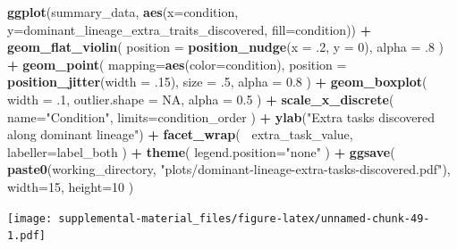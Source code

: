 \documentclass[]{book}
\newenvironment{Shaded}{\begin{snugshade}}{\end{snugshade}}
\newcommand{\DataTypeTok}[1]{\textcolor[rgb]{0.13,0.29,0.53}{#1}}
\newcommand{\DecValTok}[1]{\textcolor[rgb]{0.00,0.00,0.81}{#1}}
\newcommand{\FloatTok}[1]{\textcolor[rgb]{0.00,0.00,0.81}{#1}}
\newcommand{\KeywordTok}[1]{\textcolor[rgb]{0.13,0.29,0.53}{\textbf{#1}}}
\newcommand{\NormalTok}[1]{#1}
\newcommand{\OperatorTok}[1]{\textcolor[rgb]{0.81,0.36,0.00}{\textbf{#1}}}
\newcommand{\OtherTok}[1]{\textcolor[rgb]{0.56,0.35,0.01}{#1}}
\newcommand{\StringTok}[1]{\textcolor[rgb]{0.31,0.60,0.02}{#1}}
\begin{document}
\begin{Shaded}
\begin{Highlighting}[]
\KeywordTok{ggplot}\NormalTok{(summary_data, }\KeywordTok{aes}\NormalTok{(}\DataTypeTok{x=}\NormalTok{condition, }\DataTypeTok{y=}\NormalTok{dominant_lineage_extra_traits_discovered, }\DataTypeTok{fill=}\NormalTok{condition)) }\OperatorTok{+}
\StringTok{  }\KeywordTok{geom_flat_violin}\NormalTok{(}
    \DataTypeTok{position =} \KeywordTok{position_nudge}\NormalTok{(}\DataTypeTok{x =} \FloatTok{.2}\NormalTok{, }\DataTypeTok{y =} \DecValTok{0}\NormalTok{),}
    \DataTypeTok{alpha =} \FloatTok{.8}
\NormalTok{  ) }\OperatorTok{+}
\StringTok{  }\KeywordTok{geom_point}\NormalTok{(}
    \DataTypeTok{mapping=}\KeywordTok{aes}\NormalTok{(}\DataTypeTok{color=}\NormalTok{condition),}
    \DataTypeTok{position =} \KeywordTok{position_jitter}\NormalTok{(}\DataTypeTok{width =} \FloatTok{.15}\NormalTok{),}
    \DataTypeTok{size =} \FloatTok{.5}\NormalTok{,}
    \DataTypeTok{alpha =} \FloatTok{0.8}
\NormalTok{  ) }\OperatorTok{+}
\StringTok{  }\KeywordTok{geom_boxplot}\NormalTok{(}
    \DataTypeTok{width =} \FloatTok{.1}\NormalTok{,}
    \DataTypeTok{outlier.shape =} \OtherTok{NA}\NormalTok{,}
    \DataTypeTok{alpha =} \FloatTok{0.5}
\NormalTok{  ) }\OperatorTok{+}
\StringTok{  }\KeywordTok{scale_x_discrete}\NormalTok{(}
    \DataTypeTok{name=}\StringTok{"Condition"}\NormalTok{,}
    \DataTypeTok{limits=}\NormalTok{condition_order}
\NormalTok{  ) }\OperatorTok{+}
\StringTok{  }\KeywordTok{ylab}\NormalTok{(}\StringTok{"Extra tasks discovered along dominant lineage"}\NormalTok{) }\OperatorTok{+}
\StringTok{  }\KeywordTok{facet_wrap}\NormalTok{(}
    \OperatorTok{~}\NormalTok{extra_task_value,}
    \DataTypeTok{labeller=}\NormalTok{label_both}
\NormalTok{  ) }\OperatorTok{+}
\StringTok{  }\KeywordTok{theme}\NormalTok{(}
    \DataTypeTok{legend.position=}\StringTok{"none"}
\NormalTok{  ) }\OperatorTok{+}
\StringTok{  }\KeywordTok{ggsave}\NormalTok{(}
    \KeywordTok{paste0}\NormalTok{(working_directory, }\StringTok{"plots/dominant-lineage-extra-tasks-discovered.pdf"}\NormalTok{),}
    \DataTypeTok{width=}\DecValTok{15}\NormalTok{,}
    \DataTypeTok{height=}\DecValTok{10}
\NormalTok{  )}
\end{Highlighting}
\end{Shaded}

\texttt{[image: supplemental-material\_files/figure-latex/unnamed-chunk-49-1.pdf]}

\begin{Shaded}
\end{Shaded}
\end{document}
